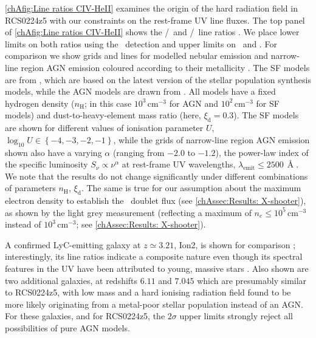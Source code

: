 \cref{chAfig:Line ratios CIV-HeII} examines the origin of the hard radiation field in RCS0224z5 with our constraints on the rest-frame UV line fluxes. The top panel of \cref{chAfig:Line ratios CIV-HeII} shows the \CIV/\CIII\ and \CIV/\HeII\ line ratios \citep[a SF versus AGN diagnostic proposed by ][]{2016MNRAS.456.3354F}. We place lower limits on both ratios using the \CIV\ detection and upper limits on \CIII\ and \HeII. For comparison we show grids and lines for modelled nebular emission and narrow-line region AGN emission coloured according to their metallicity \citep[see legend; assuming a solar metallicity of $Z_\odot = 0.01524$,][]{2012MNRAS.427..127B}. The SF models are from \citet{2016MNRAS.462.1757G}, which are based on the latest version of the \citet{2003MNRAS.344.1000B} stellar population synthesis models, while the AGN models are drawn from \citet{2016MNRAS.456.3354F}. All models have a fixed hydrogen density ($n_\text{H}$; in this case $10^3 \, \mathrm{cm^{-3}}$ for AGN and $10^2 \, \mathrm{cm^{-3}}$ for SF models) and dust-to-heavy-element mass ratio (here, $\xi_\text{d}=0.3$). The SF models are shown for different values of ionisation parameter $U$, $\log_{10} U \in \left\{-4, -3, -2, -1 \right\}$, while the grids of narrow-line region AGN emission shown also have a varying $\alpha$ (ranging from $-2.0$ to $-1.2$), the power-law index of the specific luminosity $S_\nu \propto \nu^\alpha$ at rest-frame UV wavelengths, $\lambda_\text{emit} \leq 2500 \, \Angstrom$. We note that the results do not change significantly under different combinations of parameters $n_\text{H}$, $\xi_\text{d}$. The same is true for our assumption about the maximum electron density to establish the \CIII\ doublet flux (see \cref{chAssec:Results: X-shooter}), as shown by the light grey measurement (reflecting a maximum of $n_e \leq 10^5 \, \mathrm{cm^{-3}}$ instead of $10^3 \, \mathrm{cm^{-3}}$; see \cref{chAssec:Results: X-shooter}).

A confirmed LyC-emitting galaxy at $z \simeq 3.21$, Ion2, is shown for comparison \citep{2016A&A...585A..51D, 2016ApJ...825...41V, 2020MNRAS.491.1093V}; interestingly, its line ratios indicate a composite nature even though its spectral features in the UV have been attributed to young, massive stars \citep{2020MNRAS.491.1093V}. Also shown are two additional galaxies, at redshifts $6.11$ \citep{2015MNRAS.454.1393S} and $7.045$ \citep{2017ApJ...836L..14M} which are presumably similar to RCS0224z5, with low mass and a hard ionising radiation field found to be more likely originating from a metal-poor stellar population instead of an AGN. For these galaxies, and for RCS0224z5, the $2 \sigma$ upper limits strongly reject all possibilities of pure AGN models.

